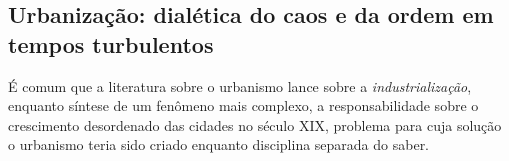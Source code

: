 \subsection{Urbanização: dialética do caos e da ordem em tempos turbulentos}

É comum que a literatura sobre o urbanismo lance sobre a \textit{industrialização}, enquanto síntese de um fenômeno mais complexo, a responsabilidade sobre o crescimento desordenado das cidades no século XIX, problema para cuja solução o urbanismo teria sido criado enquanto disciplina separada do saber. 


